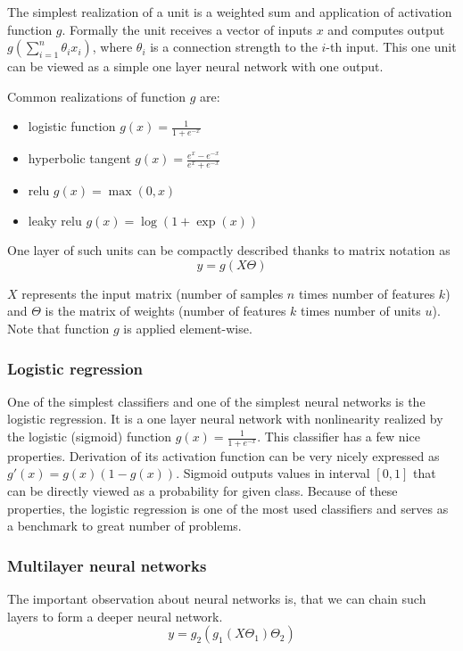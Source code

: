     The simplest realization of a unit is a weighted sum and application of activation function $g$. 
    Formally the unit receives a vector of inputs $x$ and computes output $g(\sum_{i=1}^n \theta_i x_i)$, 
    where $\theta_i$ is a connection strength to the $i$-th input.
    This one unit can be viewed as a simple one layer neural network with one output.
    
    Common realizations of function $g$ are: 
    \begin{itemize}
        \item logistic function $g(x) = \frac{1}{1+e^{-x}}$
        \item hyperbolic tangent $g(x)=\frac{e^x-e^{-x}}{e^x+e^{-x}}$
        \item relu $g(x) = \max(0,x)$ 
        \item leaky relu $g(x)=\log(1+\exp(x))$
    \end{itemize}
    
    One layer of such units can be compactly described thanks to matrix notation as
    $$y=g(X \Theta)$$
    
    $X$ represents the input matrix (number of samples $n$ times number of features $k$) and $\Theta$ is the matrix of weights (number of features $k$ times number of units $u$). Note that function $g$ is applied element-wise.
    
    \subsubsection{Logistic regression}
    One of the simplest classifiers and one of the simplest neural networks is the logistic regression.
    It is a one layer neural network with nonlinearity realized by the logistic (sigmoid) function $g(x) = \frac{1}{1+e^{-x}}$.
    This classifier has a few nice properties. 
    Derivation of its activation function can be very nicely expressed as $g'(x) = g(x)(1-g(x))$.
    Sigmoid outputs values in interval $[0,1]$ that can be directly viewed as a probability for given class.
    Because of these properties, the logistic regression is one of the most used classifiers and serves as a benchmark to great number of problems.
    
    \subsubsection{Multilayer neural networks}
    The important observation about neural networks is, that we can chain such layers to form a deeper neural network.
    $$y=g_2(g_1(X \Theta_1) \Theta_2)$$
    
